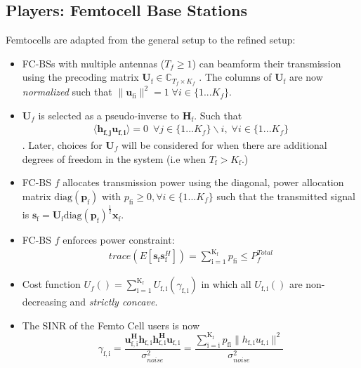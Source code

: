 \documentclass[12pt,a4paper]{report}
\begin{document}
\subsection{Players: Femtocell Base Stations}
Femtocells are adapted from the general setup to the refined setup:
\begin{itemize}
\item 
	FC-BSs with multiple antennas ($T_f \geq 1$) can beamform their transmission using the precoding 	
	matrix $\mathbf{U}_{\mathrm{f}} \in \mathbb{C}_{T_f \times K_f}$ .
	The columns of $\mathbf{U}_{\mathrm{f}}$ are now \emph{normalized} such that 
	 $\|\mathbf{u}_{\mathrm{fi}}\|^2 =1 \;\forall i \in \{1 ... K_f\}$.
\\

\item 
$\mathbf{U}_f$ is selected as a pseudo-inverse to $\mathbf{H_\mathrm{f}}$.
Such that
\begin{gather*}
\langle \mathbf{h_{f,j}}\mathbf{u_{f,i}} \rangle =0\  \; \forall j \in \{1... K_f\}\backslash i ,\; \forall i \in \{1 ... K_f\}
\end{gather*}. Later, choices for $\mathbf{U}_f$ will be considered for when there are additional degrees of freedom in the system (i.e when $T_{\text{f}}> K_{\text{f}}$.)

\item  
	FC-BS $f$ allocates  transmission power using the diagonal, power allocation  	
	matrix $\mathrm{diag}(\mathbf{p}_{\mathrm{f}})$ with $p_{\mathrm{fi}} \geq 0, \forall i \in \{1 ... K_f\}$
such that the transmitted 		
	signal is 
	$\mathbf{s}_{\mathrm{f}	}= \mathbf{U_{\mathrm{f}}} 
	\mathrm{diag}(\mathbf{p}_{\mathrm{f}})^{\frac{1}{2}}
	\mathbf{x_{\mathrm{f}}}$.
\\
\item 
	FC-BS $f$ enforces power constraint:
	\begin{gather*}
	trace(E[\mathbf{s}_\mathrm{f}\mathbf{s}_\mathrm{f}^H]) =
	\sum_{\mathrm{i=1}}^{\mathrm{K_{\mathrm{f}}}} p_{\mathrm{fi}}
	  \leq P^{Total}_{f} 
	  	\end{gather*}



\item 
	Cost function $U_f() =
	\sum_{\mathrm{i=1}}^{\mathrm{K_f}}
    	U_{\mathrm{f,i}}(\gamma_{\mathrm{f,i}}) $
    	in which all $U_{\mathrm{f,i}}()$ are non-decreasing and
    	\emph{strictly concave}.
\item The SINR of the Femto Cell users is now
\begin{equation}\label{zf_snr}
	\gamma_{\mathrm{f,i}} = 	\frac{\mathbf{u^H_{\mathrm{f,i}}h_{\mathrm{f,i}}h^H_{\mathrm{f,i}}u_{\mathrm{f,i}}}}
	{\sigma^2_{noise}  
	}=\frac{\sum_{\mathrm{i=i}}^{\mathrm{K_{f}}}
 p_{\mathrm{fi}}\|h_{\mathrm{f,i}}u_{\mathrm{f,i}}\|^2}
	{\sigma^2_{noise}  
	}
	\end{equation}

\end{itemize}
\end{document}
